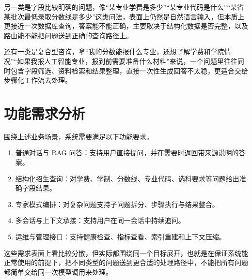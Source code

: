 \documentclass[UTF8,zihao=-4,oneside]{ctexbook}
\numberwithin{equation}{chapter}
\begin{document}
另一类是字段比较明确的问题，像“某专业学费是多少”“某专业代码是什么”“某省某批次最低录取分数线是多少”这类问法，表面上仍然是自然语言输入，但本质上更接近一次数据库查询，答案能不能正确，主要取决于结构化数据是否完整，以及路由能不能把问题送到正确的查询路径上。

还有一类是复合型咨询，拿“我的分数能报什么专业，还想了解学费和学院情况”“如果我报人工智能专业，报到前需要准备什么材料”来说，一个问题里往往同时包含字段筛选、资料检索和结果整理，直接一次性生成回答不太稳，更适合交给步骤化工作流去处理。

\section{功能需求分析}
围绕上述业务场景，系统需要满足以下功能要求。
\begin{enumerate}
  \item 普通对话与 RAG 问答：支持用户直接提问，并在需要时返回带来源说明的答案。
  \item 结构化招生查询：对学费、学制、分数线、专业代码、选科要求等问题给出准确字段结果。
  \item 专家模式编排：对复杂问题支持子问题拆分、步骤执行与结果整合。
  \item 多会话与上下文承接：支持用户在同一会话中持续追问。
  \item 运维与管理接口：支持健康检查、指标查看、索引重建和上下文压缩。
\end{enumerate}

这些需求表面上看比较分散，但实际都围绕同一个目标展开，也就是在保证系统能正常使用的前提下，把不同类型的问题送到更合适的处理路径中，不能把所有问题都简单交给同一次模型调用来处理。
\end{document}
